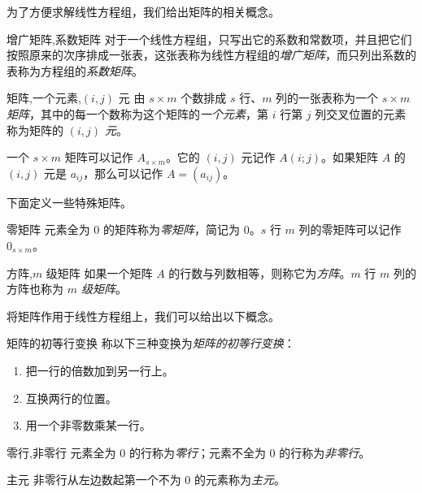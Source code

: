为了方便求解线性方程组，我们给出矩阵的相关概念。

\begin{definition}{增广矩阵,系数矩阵}
	对于一个线性方程组，只写出它的系数和常数项，并且把它们按照原来的次序排成一张表，这张表称为线性方程组的\emph{增广矩阵}，而只列出系数的表称为方程组的\emph{系数矩阵}。
\end{definition}

\begin{definition}{矩阵,一个元素,$(i \comma j)$ 元}
	由 $s \times m$ 个数排成 $s$ 行、$m$ 列的一张表称为一个 \emph{$s \times m$ 矩阵}，其中的每一个数称为这个矩阵的\emph{一个元素}，第 $i$ 行第 $j$ 列交叉位置的元素称为矩阵的 \emph{$(i, j)$ 元}。
\end{definition}

一个 $s \times m$ 矩阵可以记作 $A_{s \times m}$。它的 $(i, j)$ 元记作 $A(i; j)$。如果矩阵 $A$ 的 $(i, j)$ 元是 $a_{ij}$，那么可以记作 $A = (a_{ij})$。

下面定义一些特殊矩阵。

\begin{definition}{零矩阵}
	元素全为 $0$ 的矩阵称为\emph{零矩阵}，简记为 $0$。$s$ 行 $m$ 列的零矩阵可以记作 $0_{s \times m}$。
\end{definition}

\begin{definition}{方阵,$m$ 级矩阵}
	如果一个矩阵 $A$ 的行数与列数相等，则称它为\emph{方阵}。$m$ 行 $m$ 列的方阵也称为 \emph{$m$ 级矩阵}。
\end{definition}

将矩阵作用于线性方程组上，我们可以给出以下概念。

\begin{definition}{矩阵的初等行变换}
	称以下三种变换为\emph{矩阵的初等行变换}：
	\begin{enumerate}
		\item 把一行的倍数加到另一行上。
		\item 互换两行的位置。
		\item 用一个非零数乘某一行。
	\end{enumerate}
\end{definition}

\begin{definition}{零行,非零行}
	元素全为 $0$ 的行称为\emph{零行}；元素不全为 $0$ 的行称为\emph{非零行}。
\end{definition}

\begin{definition}{主元}
	非零行从左边数起第一个不为 $0$ 的元素称为\emph{主元}。
\end{definition}

